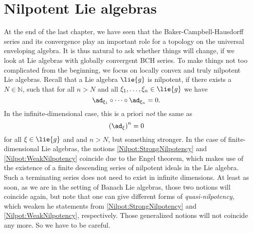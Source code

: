 
%
%

\chapter{Nilpotent Lie algebras}

At the end of the last chapter, we have seen that the Baker-Campbell-Hausdorff 
series and its convergence play an important role for a topology on the 
universal enveloping algebra. It is thus natural to ask whether things will 
change, if we look at Lie algebras with globally convergent BCH 
series. To make things not too complicated from the beginning, we focus on 
locally convex and truly nilpotent Lie algebras. Recall that a Lie algebra 
$\lie{g}$ is nilpotent, if there exists a $N \in \mathbb{N}$, such that for 
all $n > N$ and all $\xi_1, \ldots, \xi_n \in \lie{g}$ we have
\begin{equation}
	\label{Nilpot:StrongNilpotency}
	\ad_{\xi_1} \circ \cdots \circ \ad_{\xi_n}
	=
	0.
\end{equation}
In the infinite-dimensional case, this is a priori \emph{not} the same as 
\begin{equation}
	\label{Nilpot:WeakNilpotency}
	\left( \ad_{\xi} \right)^n
	=
	0
\end{equation}
for all $\xi \in \lie{g}$ and and $n > N$, but something
stronger. In the case of finite-dimensional Lie algebras, the notions 
\eqref{Nilpot:StrongNilpotency} and \eqref{Nilpot:WeakNilpotency} coincide due 
to the Engel theorem, which makes use of the existence of a 
finite descending series of nilpotent ideals in the Lie algebra. Such a 
terminating series does not need to exist in infinite dimensions. At least as 
soon, as we are in the setting of Banach Lie algebras, those two notions will 
coincide again, but note that one can give different forms of 
\emph{quasi-nilpotency}, which weaken he statements from 
\eqref{Nilpot:StrongNilpotency} and \eqref{Nilpot:WeakNilpotency}, respectively. 
Those generalized notions will not coincide any more. So we have to be careful.


